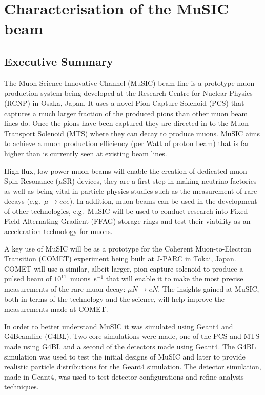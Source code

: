 \part{Characterisation of the MuSIC beam} %
\label{prt:characterisation_of_the_music_beam}

\chapter{Executive Summary} %
\label{cha:executive_summary}
The Muon Science Innovative Channel (MuSIC) beam line is a prototype muon production system being developed at the Research Centre for Nuclear Physics (RCNP) in Osaka, Japan. It uses a novel Pion Capture Solenoid (PCS) that captures a much larger fraction of the produced pions than other muon beam lines do. Once the pions have been captured they are directed in to the Muon Transport Solenoid (MTS) where they can decay to produce muons. MuSIC aims to achieve a muon production efficiency (per Watt of proton beam) that is far higher than is currently seen at existing beam lines. 

High flux, low power muon beams will enable the creation of dedicated muon Spin Resonance (\(\mu\)SR) devices, they are a first step in making neutrino factories as well as being vital in particle physics studies such as the measurement of rare decays (e.g.\ \(\mu\rightarrow eee\)). In addition, muon beams can be used in the development of other technologies, e.g.\ MuSIC will be used to conduct research into Fixed Field Alternating Gradient (FFAG) storage rings and test their viability as an acceleration technology for muons.

A key use of MuSIC will be as a prototype for the Coherent Muon-to-Electron Transition (COMET) experiment being built at J-PARC in Tokai, Japan. COMET will use a similar, albeit larger, pion capture solenoid to produce a pulsed beam of \(10^{11}\)~muons~s\(^{-1}\) that will enable it to make the most precise measurements of the rare muon decay: \(\mu N \rightarrow eN\). The insights gained at MuSIC, both in terms of the technology and the science, will help improve the measurements made at COMET. 

In order to better understand MuSIC it was simulated using Geant4 and G4Beamline (G4BL). Two core simulations were made, one of the PCS and MTS made using G4BL and a second of the detectors made using Geant4. The G4BL simulation was used to test the initial designs of MuSIC and later to provide realistic particle distributions for the Geant4 simulation. The detector simulation, made in Geant4, was used to test detector configurations and refine analysis techniques.

